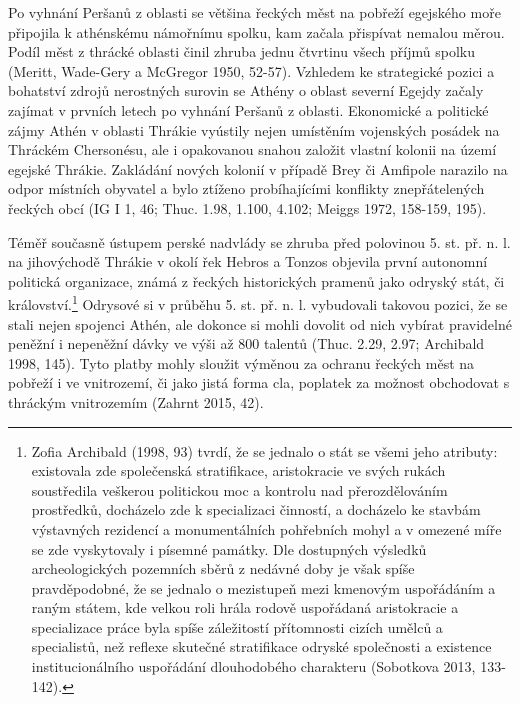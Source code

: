 Po vyhnání Peršanů z oblasti se většina řeckých měst na pobřeží egejského moře připojila k athénskému námořnímu spolku, kam začala přispívat nemalou měrou. Podíl měst z thrácké oblasti činil zhruba jednu čtvrtinu všech příjmů spolku (Meritt, Wade-Gery a McGregor 1950, 52-57). Vzhledem ke strategické pozici a bohatství zdrojů nerostných surovin se Athény o oblast severní Egejdy začaly zajímat v prvních letech po vyhnání Peršanů z oblasti. Ekonomické a politické zájmy Athén v oblasti Thrákie vyústily nejen umístěním vojenských posádek na Thráckém Chersonésu, ale i opakovanou snahou založit vlastní kolonii na území egejské Thrákie. Zakládání nových kolonií v případě Brey či Amfipole narazilo na odpor místních obyvatel a bylo ztíženo probíhajícími konflikty znepřátelených řeckých obcí (IG I 1, 46; Thuc. 1.98, 1.100, 4.102; Meiggs 1972, 158-159, 195).

Téměř současně ústupem perské nadvlády se zhruba před polovinou 5. st. př. n. l. na jihovýchodě Thrákie v okolí řek Hebros a Tonzos objevila první autonomní politická organizace, známá z řeckých historických pramenů jako odryský stát, či království.\footnote{Zofia Archibald (1998, 93) tvrdí, že se jednalo o stát se všemi jeho atributy: existovala zde společenská stratifikace, aristokracie ve svých rukách soustředila veškerou politickou moc a kontrolu nad přerozdělováním prostředků, docházelo zde k specializaci činností, a docházelo ke stavbám výstavných rezidencí a monumentálních pohřebních mohyl a v omezené míře se zde vyskytovaly i písemné památky. Dle dostupných výsledků archeologických pozemních sběrů z nedávné doby je však spíše pravděpodobné, že se jednalo o mezistupeň mezi kmenovým uspořádáním a raným státem, kde velkou roli hrála rodově uspořádaná aristokracie a specializace práce byla spíše záležitostí přítomnosti cizích umělců a specialistů, než reflexe skutečné stratifikace odryské společnosti a existence institucionálního uspořádání dlouhodobého charakteru (Sobotkova 2013, 133-142).} Odrysové si v průběhu 5. st. př. n. l. vybudovali takovou pozici, že se stali nejen spojenci Athén, ale dokonce si mohli dovolit od nich vybírat pravidelné peněžní i nepeněžní dávky ve výši až 800 talentů (Thuc. 2.29, 2.97; Archibald 1998, 145). Tyto platby mohly sloužit výměnou za ochranu řeckých měst na pobřeží i ve vnitrozemí, či jako jistá forma cla, poplatek za možnost obchodovat s thráckým vnitrozemím (Zahrnt 2015, 42).

